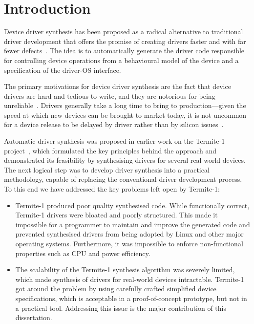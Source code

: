 \chapter{Introduction}

Device driver synthesis has been proposed as a radical alternative to traditional driver development that offers the promise of creating drivers faster and with far fewer defects~\cite{Ryzhyk_CKSH_09}. The idea is to automatically generate the driver code responsible for controlling device operations from a behavioural model of the device and a specification of the driver-OS interface.

The primary motivations for device driver synthesis are the fact that device drivers are hard and tedious to write, and they are notorious for being unreliable~\cite{Chou_YCHE_01,Ganapathi_GP_06}. Drivers generally take a long time to bring to production---given the speed at which new devices can be brought to market today, it is not uncommon for a device release to be delayed by driver rather than by silicon issues~\cite{Yavatkar_12}. 

Automatic driver synthesis was proposed in earlier work on the Termite-1 project~\cite{Ryzhyk_CKSH_09}, which formulated the key principles behind the approach and demonstrated its feasibility by synthesising drivers for several real-world devices.  The next logical step was to develop driver synthesis into a practical methodology, capable of replacing the conventional driver development process.  To this end we have addressed the key problems left open by Termite-1:

\begin{itemize}
    \item Termite-1 produced poor quality synthesised code.  While functionally correct, Termite-1 drivers were bloated and poorly structured.  This made it impossible for a programmer to maintain and improve the generated code and prevented synthesised drivers from being adopted by Linux and other major operating systems.  Furthermore, it was impossible to enforce non-functional properties such as CPU and power efficiency.
    \item The scalability of the Termite-1 synthesis algorithm was severely limited, which made synthesis of drivers for real-world devices intractable. Termite-1 got around the problem by using carefully crafted simplified device specifications, which is acceptable in a proof-of-concept prototype, but not in a practical tool. Addressing this issue is the major contribution of this dissertation.
\end{itemize}

